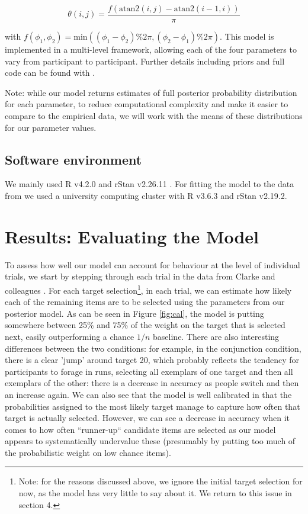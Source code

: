 \documentclass[preprints, article,submit,pdftex,moreauthors]{Definitions/mdpi}
\begin{document}
\begin{linenomath}
\begin{equation}
    \theta(i,j) = \frac{f(\text{atan2}(i, j) - \text{atan2}(i-1, i))}{\pi}
\end{equation}
\end{linenomath}

with $f(\phi_1, \phi_2) = \text{min}((\phi_1 - \phi_2) \% 2\pi, (\phi_2 - \phi_1) \% 2\pi)$. This model is implemented in a multi-level framework, allowing each of the four parameters to vary from participant to participant. Further details including priors and full code can be found with \cite{clarke2022foraging}.

Note: while our model returns estimates of full posterior probability distribution for each parameter, to reduce computational complexity and make it easier to compare to the empirical data, we will work with the means of these distributions for our parameter values. 

\subsection{Software environment}
 
We mainly used R v4.2.0 and rStan v2.26.11 \cite{rstan}. For fitting the model to the data from \cite{clarke2022} we used a university computing cluster with R v3.6.3 and rStan v2.19.2.

\section{Results: Evaluating the Model}

To assess how well our model can account for behaviour at the level of individual trials, we start by stepping through each trial in the data from Clarke and colleagues \cite{clarke2022}. For each target selection\footnote{Note: for the reasons discussed above, we ignore the initial target selection for now, as the model has very little to say about it. We return to this issue in section 4.}, in each trial, we can estimate how likely each of the remaining items are to be selected using the parameters from our posterior model. As can be seen in Figure \ref{fig:cal}, the model is putting somewhere between 25\% and 75\% of the weight on the target that is selected next, easily outperforming a chance $1/n$ baseline. There are also interesting differences between the two conditions: for example, in the conjunction condition, there is a clear 'jump' around target 20, which probably reflects the tendency for participants to forage in runs, selecting all exemplars of one target and then all exemplars of the other: there is a decrease in accuracy as people switch and then an increase again. We can also see that the model is well calibrated in that the probabilities assigned to the most likely target manage to capture how often that target is actually selected. However, we can see a decrease in accuracy when it comes to how often ``runner-up`` candidate items are selected as our model appears to systematically undervalue these (presumably by putting too much of the probabilistic weight on low chance items).
\end{document}
